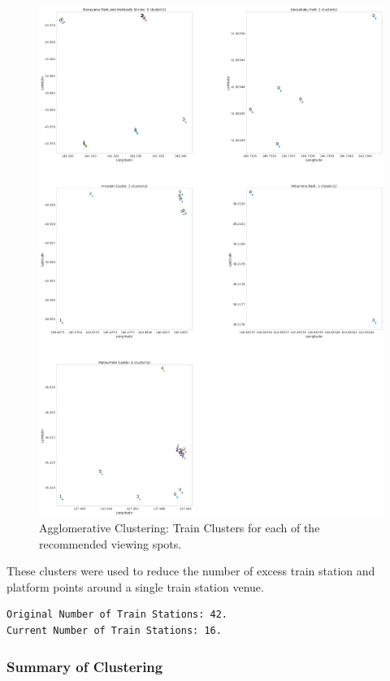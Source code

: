 \documentclass[11pt]{article}
\begin{document}
\begin{figure}[H]
  \centering
  \includegraphics[]{images/Train_Clusters.png}
  \caption{Agglomerative Clustering: Train Clusters for each of the recommended viewing spots.}
 \end{figure}
    
These clusters were used to reduce the number of excess train station and platform points around 
a single train station venue.
    
    \begin{Verbatim}[commandchars=\\\{\}]
Original Number of Train Stations: 42.
Current Number of Train Stations: 16.
    \end{Verbatim}

    \hypertarget{summary-of-clustering}{%
\subsubsection{Summary of Clustering}\label{summary-of-clustering}}
\end{document}

